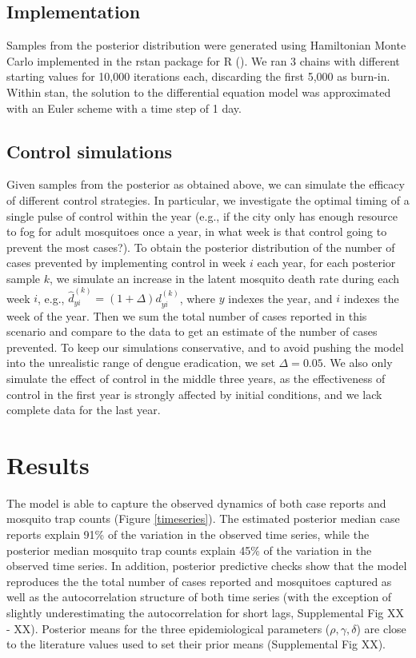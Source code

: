 \documentclass[10pt,letterpaper]{article}
\begin{document}
\subsection*{Implementation}
 
Samples from the posterior distribution were generated using Hamiltonian Monte Carlo implemented in the rstan package \cite{Carpenter2016, Rstan2017} for R (\cite{R2016}). 
We ran 3 chains with different starting values for 10,000 iterations each, discarding the first 5,000 as burn-in.
Within stan, the solution to the differential equation model was approximated with an Euler scheme with a time step of 1 day.  

\subsection*{Control simulations}

Given samples from the posterior as obtained above, we can simulate the efficacy of different control strategies.
In particular, we investigate the optimal timing of a single pulse of control within the year (e.g., if the city only has enough resource to fog for adult mosquitoes once a year, in what week is that control going to prevent the most cases?).
To obtain the posterior distribution of the number of cases prevented by implementing control in week $i$ each year, for each posterior sample $k$, we simulate an increase in the latent mosquito death rate during each week $i$, e.g.,
$\hat{d}^{(k)}_{yi} = (1 + \Delta) d^{(k)}_{yi}$, where $y$ indexes the year, and $i$ indexes the week of the year.
Then we sum the total number of cases reported in this scenario and compare to the data to get an estimate of the number of cases prevented.
To keep our simulations conservative, and to avoid pushing the model into the unrealistic range of dengue eradication, we set $\Delta = 0.05$.
We also only simulate the effect of control in the middle three years, as the effectiveness of control in the first year is strongly affected by initial conditions, and we lack complete data for the last year.

\section*{Results}

The model is able to capture the observed dynamics of both case reports and mosquito trap counts (Figure \ref{timeseries}).
The estimated posterior median case reports explain 91\% of the variation in the observed time series, while the posterior median mosquito trap counts explain 45\% of the variation in the observed time series. 
In addition, posterior predictive checks show that the model reproduces the the total number of cases reported and mosquitoes captured as well as the autocorrelation structure of both time series (with the exception of slightly underestimating the autocorrelation for short lags, Supplemental Fig XX - XX).
Posterior means for the three epidemiological parameters ($\rho, \gamma, \delta$) are close to the literature values used to set their prior means (Supplemental Fig XX).
\end{document}
